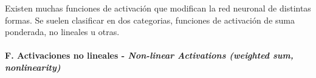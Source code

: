 Existen muchas funciones de activación que modifican la red neuronal de distintas formas.
Se suelen clasificar en dos categorias, funciones de activación de suma ponderada, no lineales u otras.


\paragraph*{F. Activaciones no lineales - \textit{Non-linear Activations (weighted sum, nonlinearity)} \cite{pytorch2024github}}




